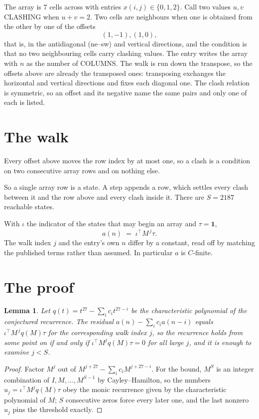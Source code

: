 \documentclass[11pt,a4paper]{article}
\theoremstyle{plain}
\newtheorem{lemma}[theorem]{Lemma}
\theoremstyle{definition}
\begin{document}
The array is $7$ cells across with entries $x(i,j)\in\{0,1,2\}$. Call two values $u,v$ CLASHING
when $u+v=2$. Two cells are neighbours when one is obtained from the other by one of
the offsets
\[
(1,-1), (1,0),
\]
that is, in the antidiagonal (ne--sw) and vertical directions, and the condition is that no two neighbouring cells carry
clashing values. The entry writes the array with $n$ as the number of COLUMNS. The walk is run down the transpose, so the offsets above are already the transposed ones: transposing exchanges the horizontal and vertical directions and fixes each diagonal one. The clash relation is symmetric, so an offset and its negative name the
same pairs and only one of each is listed.

\section{The walk}

Every offset above moves the row index by at most one, so a clash is a condition on two
consecutive array rows and on nothing else.

So a single array row is a state. A step appends a row, which settles every clash between it
and the row above and every clash inside it. There are $S=2187$ reachable states.

With $\iota$ the indicator of the states that may begin an array and $\tau=\mathbf{1}$,
\[
a(n)\;=\;\iota^{\!\top}M^{\,j}\tau .
\]
The walk index $j$ and the entry's own $n$ differ by a constant, read off by matching the
published terms rather than assumed. In particular $a$ is $C$-finite.

\section{The proof}

\begin{lemma}\label{lem:crit}
Let $q(t)=t^{27}-\sum_i c_it^{27-i}$ be the characteristic polynomial of the
conjectured recurrence. The residual $a(n)-\sum_ic_ia(n-i)$ equals
$\iota^{\!\top}M^{\,j}q(M)\tau$ for the corresponding walk index $j$, so the recurrence
holds from some point on if and only if $\iota^{\!\top}M^{j}q(M)\tau=0$ for all large $j$,
and it is enough to examine $j<S$.
\end{lemma}

\begin{proof}
Factor $M^{j}$ out of $M^{j+27}-\sum_ic_iM^{j+27-i}$. For the bound, $M^{S}$
is an integer combination of $I,M,\dots,M^{S-1}$ by Cayley--Hamilton, so the numbers
$u_j=\iota^{\!\top}M^{j}q(M)\tau$ obey the monic recurrence given by the characteristic
polynomial of $M$; $S$ consecutive zeros force every later one, and the last nonzero $u_j$
pins the threshold exactly.
\end{proof}
\end{document}

